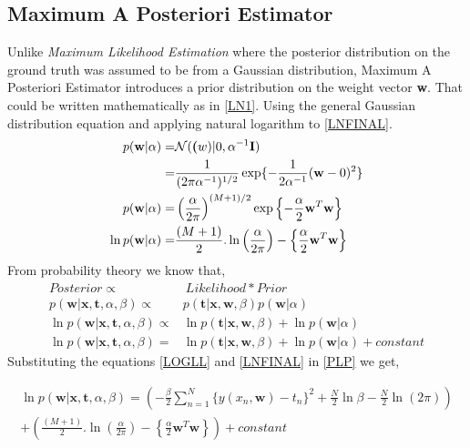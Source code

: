 \documentclass[12pt,twoside,a4paper]{article}
\begin{document}
\subsection{Maximum A Posteriori Estimator}
Unlike \textit{Maximum Likelihood Estimation} where the posterior distribution on the ground truth was assumed to be from a Gaussian distribution, Maximum A Posteriori Estimator introduces a prior distribution on the weight vector \textbf{w}. That could be written mathematically as in \eqref{LN1}. Using the general Gaussian distribution equation and applying natural logarithm to \eqref{LNFINAL}.
\begin{align} 
p(\textbf{w}|\alpha) =& \mathcal{N}(\textbf(w)|0,\alpha^{-1}\textbf{I}) \label{LN1}\\
=& \frac{1}{(2\pi\alpha^{-1})^{1/2}}\exp\{-\frac{1}{2\alpha^{-1}}(\textbf{w}-0)^2\} \\
p(\textbf{w}|\alpha) =& \left( \frac{\alpha}{2\pi}\right)^{(M+1)/2} \exp\left\{ -\frac{\alpha}{2}\textbf{w}^T\textbf{w}\right\} \\
\ln p(\textbf{w}|\alpha) =& \frac{(M+1)}{2}.\ln\left( \frac{\alpha}{2\pi}\right) - \left\{ \frac{\alpha}{2}\textbf{w}^T\textbf{w}\right\} \label{LNFINAL}
\end{align}
From probability theory we know that,
\begin{align}
Posterior \propto& \ Likelihood * Prior\\
    p(\textbf{w}|\textbf{x},\textbf{t},\alpha,\beta) \propto& p(\textbf{t}|\textbf{x},\textbf{w},\beta) p(\textbf{w}|\alpha) \\
    \ln p(\textbf{w}|\textbf{x},\textbf{t},\alpha,\beta) \propto& \ln p(\textbf{t}|\textbf{x},\textbf{w},\beta) + \ln p(\textbf{w}|\alpha) \\
    \ln p(\textbf{w}|\textbf{x},\textbf{t},\alpha,\beta) =& \ln p(\textbf{t}|\textbf{x},\textbf{w},\beta) + \ln p(\textbf{w}|\alpha) + constant \label{PLP}
\end{align}
Substituting the equations \eqref{LOGLL} and \eqref{LNFINAL} in \eqref{PLP} we get,

\begin{multline}
        \ln p(\textbf{w}|\textbf{x},\textbf{t},\alpha,\beta) = {\left( -\frac{\beta}{2}\sum_{n=1}^{N} {\{y(x_n,\textbf{w})-t_n\}^2} + \frac{N}{2}\ln\beta - \frac{N}{2}\ln(2\pi) \right )} \\ + \left ( \frac{(M+1)}{2}.\ln\left( \frac{\alpha}{2\pi}\right) - \left\{ \frac{\alpha}{2}\textbf{w}^T\textbf{w}\right\} \right ) + constant
\end{multline}
\end{document}
